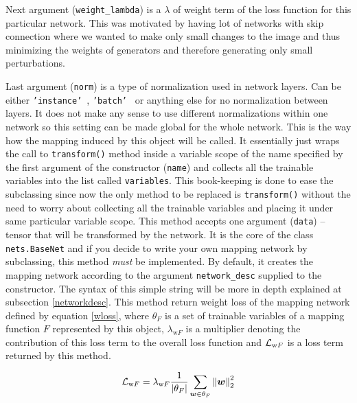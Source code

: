 \begin{itemize}
\begin{description}
Next argument (\texttt{weight\_lambda}) is a $\lambda$ of weight term of the loss function for this particular network. This was motivated by having lot of networks with skip connection where we wanted to make only small changes to the image and thus minimizing the weights of generators and therefore generating only small perturbations.

Last argument (\texttt{norm}) is a type of normalization used in network layers. Can be either \texttt{'instance'}~\cite{instancenorm}, \texttt{'batch'}~\cite{batchnorm} or anything else for no normalization between layers. It does not make any sense to use different normalizations within one network so this setting can be made global for the whole network.
 This is the way how the mapping induced by this object will be called. It essentially just wraps the call to \texttt{transform()} method inside a variable scope of the name specified by the first argument of the constructor (\texttt{name}) and collects all the trainable variables into the list called \texttt{variables}. This book-keeping is done to ease the subclassing since now the only method to be replaced is \texttt{transform()} without the need to worry about collecting all the trainable variables and placing it under same particular variable scope.
 This method accepts one argument (\texttt{data}) -- tensor that will be transformed by the network. It is the core of the class \texttt{nets.BaseNet} and if you decide to write your own mapping network by subclassing, this method {\em must} be implemented. By default, it creates the mapping network according to the argument \texttt{network\_desc} supplied to the constructor. The syntax of this simple string will be more in depth explained at subsection \ref{networkdesc}.
 This method return weight loss of the mapping network defined by equation \ref{wloss}, where $\theta_F$ is a set of trainable variables of a mapping function $F$ represented by this object, $\lambda_{\text{w}F}$ is a multiplier denoting the contribution of this loss term to the overall loss function and $\mathcal{L}_{\text{w}F}$ is a loss term returned by this method.

\begin{equation}
\mathcal{L}_{\text{w}F} = \lambda_{\text{w}F} \frac{1}{|\theta_F|} \sum_{\bm{w} \in \theta_F} \left\lVert\bm{w}\right\rVert_2^2
\label{wloss}
\end{equation}

\end{description}


\end{itemize}
